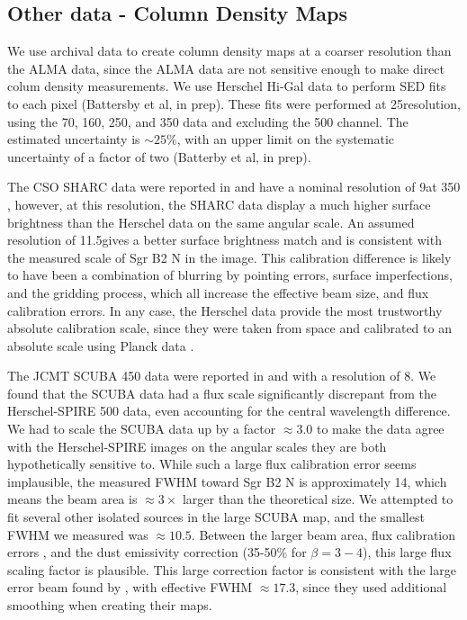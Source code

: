 \documentclass[twocolumn]{aastex61}
\newcommand{\percent}{\%\xspace}
\begin{document}
\subsection{Other data - Column Density Maps}
\label{sec:colmaps}
We use archival data to create column density maps at a coarser
resolution than the ALMA data, since the ALMA data are not sensitive
enough to make direct colum density measurements.   We use Herschel Hi-Gal
data \citep{Molinari2010a} to perform SED fits to each pixel (Battersby et al,
in prep).  These fits were performed at 25\arcsec resolution, using the 70, 160,
250, and 350 \um data and excluding the 500 \um channel.  The estimated 
uncertainty is $\sim25\%$, with an upper limit on the systematic uncertainty
of a factor of two (Batterby et al, in prep).


The CSO SHARC data were reported in \citet{Bally2010a} and have a nominal
resolution of 9\arcsec at 350 \um, however, at this resolution,
the SHARC data display a much higher surface brightness than the Herschel
data on the same angular scale.  An assumed resolution of 11.5\arcsec gives a
better surface brightness match and is consistent with the measured scale of
Sgr B2 N in the image.  This calibration difference is likely to have been a
combination of blurring by pointing errors, surface imperfections, and the
gridding process, which all increase the effective beam size, and flux
calibration errors.  In any case, the Herschel data
provide the most trustworthy absolute calibration scale, since they were taken
from space and calibrated to an absolute scale using Planck data
\citep{Bendo2013a,Bertincourt2015a}.

The JCMT SCUBA 450 \um data were reported in \citet{Pierce-Price2000a} and
\citet{di-Francesco2008a} with a resolution of 8\arcsec.  We found that the
SCUBA data had a flux scale significantly discrepant from the Herschel-SPIRE
500 \um data, even accounting for the central wavelength difference.  We had to
scale the SCUBA data up by a factor $\approx3.0$ to make the data agree with
the Herschel-SPIRE images on the angular scales they are both hypothetically
sensitive to.  While such a large flux calibration error seems implausible, the
measured FWHM toward Sgr B2 N is approximately 14\arcsec, which means the beam
area is $\approx3\times$ larger than the theoretical size.  We attempted to fit
several other isolated sources in the large SCUBA map, and the smallest FWHM we
measured was $\approx10.5$\arcsec.  Between the larger beam area, flux
calibration errors \citep[quoted at 20\percent in][]{Pierce-Price2000a}, and
the dust emissivity correction (35-50\percent for $\beta=3-4$), this large flux
scaling factor is plausible. This large correction factor is consistent with
the large error beam found by \citet{di-Francesco2008a}, with effective FWHM
$\approx17.3$\arcsec, since they used additional smoothing when creating their
maps.
\end{document}
